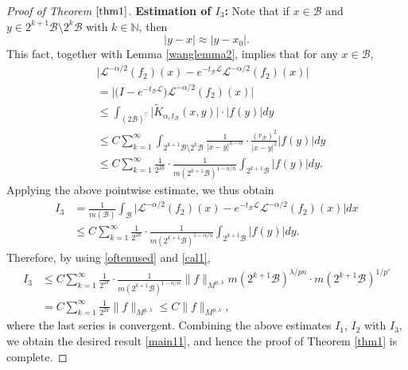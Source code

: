\documentclass[10pt, reqno]{amsart}
\theoremstyle{definition}
\theoremstyle{remark}
\numberwithin{equation}{section}
\begin{document}
\begin{proof}[Proof of Theorem $\ref{thm1}$]
\textbf{Estimation of $I_3$:} Note that if $x\in\mathcal{B}$ and $y\in 2^{k+1}\mathcal{B}\setminus 2^k \mathcal{B}$ with $k\in \mathbb{N}$, then
\begin{equation*}
|y-x|\approx|y-x_0|.
\end{equation*}
This fact, together with Lemma \ref{wanglemma2}, implies that for any $x\in \mathcal{B}$,
\begin{equation*}
\begin{split}
&\Big|\mathcal{L}^{-\alpha/2}(f_2)(x)
-e^{-t_{\mathcal{B}}\mathcal{L}}\mathcal{L}^{-\alpha/2}(f_2)(x)\Big|\\
&=\Big|\big(I-e^{-t_{\mathcal{B}}\mathcal{L}}\big)\mathcal{L}^{-\alpha/2}(f_2)(x)\Big|\\
&\leq\int_{(2\mathcal{B})^{\complement}}\big|\widetilde{K}_{\alpha,t_{\mathcal{B}}}(x,y)\big|
\cdot\big|f(y)\big|dy\\
&\leq C\sum_{k=1}^{\infty}\int_{2^{k+1}\mathcal{B}\setminus 2^k \mathcal{B}}
\frac{1}{|x-y|^{n-\alpha}}\cdot\frac{(r_{\mathcal{B}})^2}{|x-y|^{2}}\big|f(y)\big|dy\\
&\leq C\sum_{k=1}^{\infty}\frac{1}{2^{2k}}\cdot\frac{1}{m(2^{k+1}\mathcal{B})^{1-\alpha/n}}
\int_{2^{k+1}\mathcal{B}}\big|f(y)\big|dy.
\end{split}
\end{equation*}
Applying the above pointwise estimate, we thus obtain
\begin{equation*}
\begin{split}
I_3&=\frac{1}{m(\mathcal{B})}\int_{\mathcal{B}}
\big|\mathcal{L}^{-\alpha/2}(f_2)(x)-e^{-t_{\mathcal{B}}\mathcal{L}}\mathcal{L}^{-\alpha/2}(f_2)(x)\big|dx\\
&\leq C\sum_{k=1}^{\infty}\frac{1}{2^{2k}}\cdot\frac{1}{m(2^{k+1}\mathcal{B})^{1-\alpha/n}}
\int_{2^{k+1}\mathcal{B}}\big|f(y)\big|dy.
\end{split}
\end{equation*}
Therefore, by using \eqref{oftenused} and \eqref{cal1},
\begin{equation*}
\begin{split}
I_3&\leq C\sum_{k=1}^{\infty}\frac{1}{2^{2k}}\cdot\frac{1}{m(2^{k+1}\mathcal{B})^{1-\alpha/n}}
\big\|f\big\|_{M^{p,\lambda}}m(2^{k+1}\mathcal{B})^{\lambda/{pn}}\cdot m(2^{k+1}\mathcal{B})^{1/{p'}}\\
&=C\sum_{k=1}^{\infty}\frac{1}{2^{2k}}\big\|f\big\|_{M^{p,\lambda}}\leq C\big\|f\big\|_{M^{p,\lambda}},
\end{split}
\end{equation*}
where the last series is convergent. Combining the above estimates $I_1$, $I_2$ with $I_3$, we obtain the desired result \eqref{main11}, and hence the proof of Theorem \ref{thm1} is complete.
\end{proof}
\end{document}
